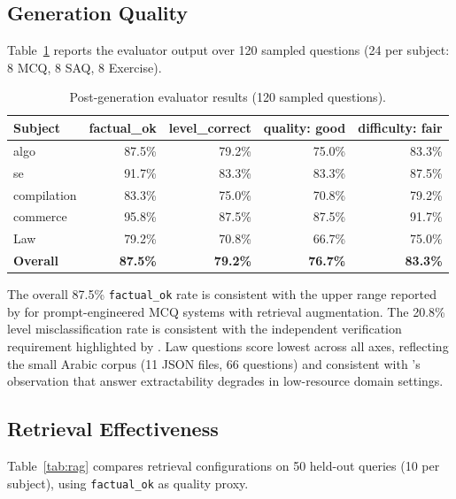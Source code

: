 \documentclass[12pt, a4paper]{article}
\begin{document}
\subsection{Generation Quality}

Table~\ref{tab:eval} reports the evaluator output over 120 sampled questions
(24 per subject: 8 MCQ, 8 SAQ, 8 Exercise).

\begin{table}[H]
\centering
\caption{Post-generation evaluator results (120 sampled questions).}
\label{tab:eval}
\begin{tabular}{lrrrr}
\toprule
\textbf{Subject} & \textbf{factual\_ok} & \textbf{level\_correct}
  & \textbf{quality: good} & \textbf{difficulty: fair} \\
\midrule
algo        & 87.5\% & 79.2\% & 75.0\% & 83.3\% \\
se          & 91.7\% & 83.3\% & 83.3\% & 87.5\% \\
compilation & 83.3\% & 75.0\% & 70.8\% & 79.2\% \\
commerce    & 95.8\% & 87.5\% & 87.5\% & 91.7\% \\
Law         & 79.2\% & 70.8\% & 66.7\% & 75.0\% \\
\midrule
\textbf{Overall} & \textbf{87.5\%} & \textbf{79.2\%} & \textbf{76.7\%} & \textbf{83.3\%} \\
\bottomrule
\end{tabular}
\end{table}

The overall 87.5\% \texttt{factual\_ok} rate is consistent with the upper range
reported by \citet{mucciaccia2025mcq} for prompt-engineered MCQ systems with
retrieval augmentation. The 20.8\% level misclassification rate is consistent with
the independent verification requirement highlighted by \citet{meissner2024itemforge}.
Law questions score lowest across all axes, reflecting the small Arabic corpus
(11 JSON files, 66 questions) and consistent with \citet{morris2024aqg}'s observation
that answer extractability degrades in low-resource domain settings.

\subsection{Retrieval Effectiveness}

Table~\ref{tab:rag} compares retrieval configurations on 50 held-out queries
(10 per subject), using \texttt{factual\_ok} as quality proxy.
\end{document}
